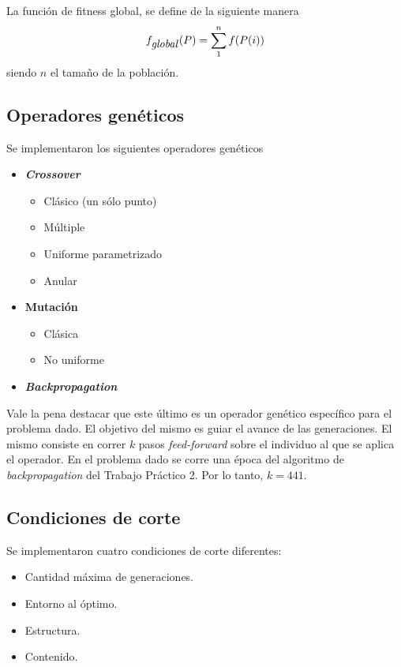 \documentclass{article}
\begin{document}
La función de fitness global, se define de la siguiente manera
\begin{equation}
      f_{\mbox{\emph{global}}}(P) = \sum_{1}^{n} f(P(i))
\end{equation}
siendo $n$ el tamaño de la población.

\subsection{Operadores genéticos}
Se implementaron los siguientes operadores genéticos

\begin{itemize}
 \item \textbf{\emph{Crossover}}
    \begin{itemize}
     \item Clásico (un sólo punto)
     \item Múltiple
     \item Uniforme parametrizado
     \item Anular
    \end{itemize}
 \item \textbf{Mutación}
    \begin{itemize}
      \item Clásica
      \item No uniforme
    \end{itemize}
 \item \textbf{\emph{Backpropagation}}
\end{itemize}

Vale la pena destacar que este último es un operador genético específico para el problema dado. El objetivo del mismo 
es guiar el avance de las generaciones. El mismo consiste en correr $k$ pasos \emph{feed-forward} sobre el individuo al que se
aplica el operador. En el problema dado se corre una época del algoritmo de \emph{backpropagation} del Trabajo Práctico 2. Por lo tanto,
$k = 441$.

\subsection{Condiciones de corte}

Se implementaron cuatro condiciones de corte diferentes:

\begin{itemize}
       \item Cantidad máxima de generaciones.
       \item Entorno al óptimo.
       \item Estructura.
       \item Contenido.
\end{itemize}
\end{document}
